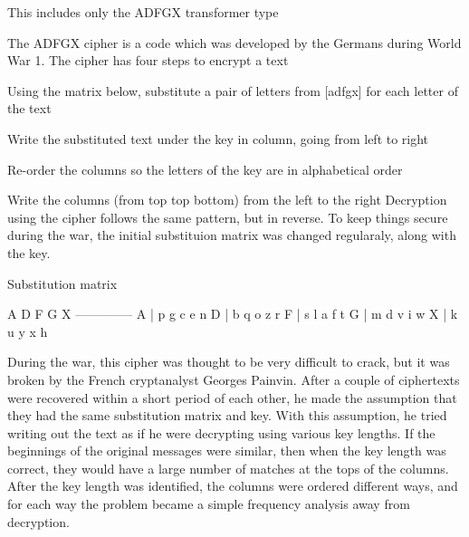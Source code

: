 This includes only the A\+D\+F\+GX transformer type

The A\+D\+F\+GX cipher is a code which was developed by the Germans during World War 1. The cipher has four steps to encrypt a text
\begin{DoxyItemize}
\item Using the matrix below, substitute a pair of letters from \mbox{[}adfgx\mbox{]} for each letter of the text
\item Write the substituted text under the key in column, going from left to right
\item Re-\/order the columns so the letters of the key are in alphabetical order
\item Write the columns (from top top bottom) from the left to the right Decryption using the cipher follows the same pattern, but in reverse. To keep things secure during the war, the initial substituion matrix was changed regularaly, along with the key.
\end{DoxyItemize}

Substitution matrix \begin{DoxyVerb}    A  D  F  G  X
   --------------
A | p  g  c  e  n
D | b  q  o  z  r
F | s  l  a  f  t
G | m  d  v  i  w
X | k  u  y  x  h
\end{DoxyVerb}


During the war, this cipher was thought to be very difficult to crack, but it was broken by the French cryptanalyst Georges Painvin. After a couple of ciphertexts were recovered within a short period of each other, he made the assumption that they had the same substitution matrix and key. With this assumption, he tried writing out the text as if he were decrypting using various key lengths. If the beginnings of the original messages were similar, then when the key length was correct, they would have a large number of matches at the tops of the columns. After the key length was identified, the columns were ordered different ways, and for each way the problem became a simple frequency analysis away from decryption. 